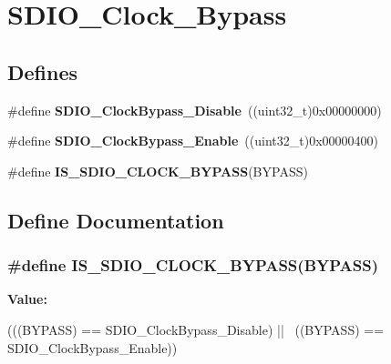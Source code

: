 \hypertarget{group__SDIO__Clock__Bypass}{
\section{SDIO\_\-Clock\_\-Bypass}
\label{group__SDIO__Clock__Bypass}
}
\subsection*{Defines}
\begin{DoxyCompactItemize}
\item 
\hypertarget{group__SDIO__Clock__Bypass_gacc168d55136a0c6575e5afd7a6550343}{
\#define {\bfseries SDIO\_\-ClockBypass\_\-Disable}~((uint32\_\-t)0x00000000)}
\label{group__SDIO__Clock__Bypass_gacc168d55136a0c6575e5afd7a6550343}

\item 
\hypertarget{group__SDIO__Clock__Bypass_ga5e1e9f7e05ea62dd2315eb556bc10e5c}{
\#define {\bfseries SDIO\_\-ClockBypass\_\-Enable}~((uint32\_\-t)0x00000400)}
\label{group__SDIO__Clock__Bypass_ga5e1e9f7e05ea62dd2315eb556bc10e5c}

\item 
\#define {\bfseries IS\_\-SDIO\_\-CLOCK\_\-BYPASS}(BYPASS)
\end{DoxyCompactItemize}


\subsection{Define Documentation}
\hypertarget{group__SDIO__Clock__Bypass_ga5d5a2fcdd3150e4a89c5aa1efd738dec}{
\subsubsection[{IS\_\-SDIO\_\-CLOCK\_\-BYPASS}]{\setlength{\rightskip}{0pt plus 5cm}\#define IS\_\-SDIO\_\-CLOCK\_\-BYPASS(BYPASS)}}
\label{group__SDIO__Clock__Bypass_ga5d5a2fcdd3150e4a89c5aa1efd738dec}
{\bfseries Value:}
\begin{DoxyCode}
(((BYPASS) == SDIO_ClockBypass_Disable) || \
                                     ((BYPASS) == SDIO_ClockBypass_Enable))
\end{DoxyCode}
